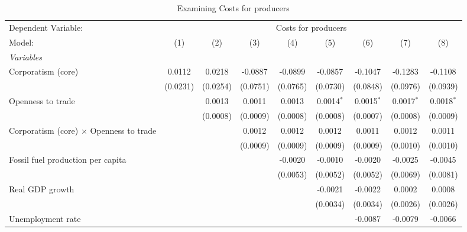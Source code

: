 
\begin{table}[htbp]
   \caption{Examining Costs for producers}
   \centering
   \begin{tabular}{lcccccccc}
      \tabularnewline \midrule \midrule
      Dependent Variable: & \multicolumn{8}{c}{Costs for producers}\\
      Model:                                         & (1)      & (2)      & (3)      & (4)      & (5)          & (6)          & (7)          & (8)\\  
      \midrule
      \emph{Variables}\\
      Corporatism (core)                             & 0.0112   & 0.0218   & -0.0887  & -0.0899  & -0.0857      & -0.1047      & -0.1283      & -0.1108\\   
                                                     & (0.0231) & (0.0254) & (0.0751) & (0.0765) & (0.0730)     & (0.0848)     & (0.0976)     & (0.0939)\\   
      Openness to trade                              &          & 0.0013   & 0.0011   & 0.0013   & 0.0014$^{*}$ & 0.0015$^{*}$ & 0.0017$^{*}$ & 0.0018$^{*}$\\   
                                                     &          & (0.0008) & (0.0009) & (0.0008) & (0.0008)     & (0.0007)     & (0.0008)     & (0.0009)\\   
      Corporatism (core) $\times$ Openness to trade  &          &          & 0.0012   & 0.0012   & 0.0012       & 0.0011       & 0.0012       & 0.0011\\   
                                                     &          &          & (0.0009) & (0.0009) & (0.0009)     & (0.0009)     & (0.0010)     & (0.0010)\\   
      Fossil fuel production per capita              &          &          &          & -0.0020  & -0.0010      & -0.0020      & -0.0025      & -0.0045\\   
                                                     &          &          &          & (0.0053) & (0.0052)     & (0.0052)     & (0.0069)     & (0.0081)\\   
      Real GDP growth                                &          &          &          &          & -0.0021      & -0.0022      & 0.0002       & 0.0008\\   
                                                     &          &          &          &          & (0.0034)     & (0.0034)     & (0.0026)     & (0.0026)\\   
      Unemployment rate                              &          &          &          &          &              & -0.0087      & -0.0079      & -0.0066\\   

\end{tabular}
\end{table}
